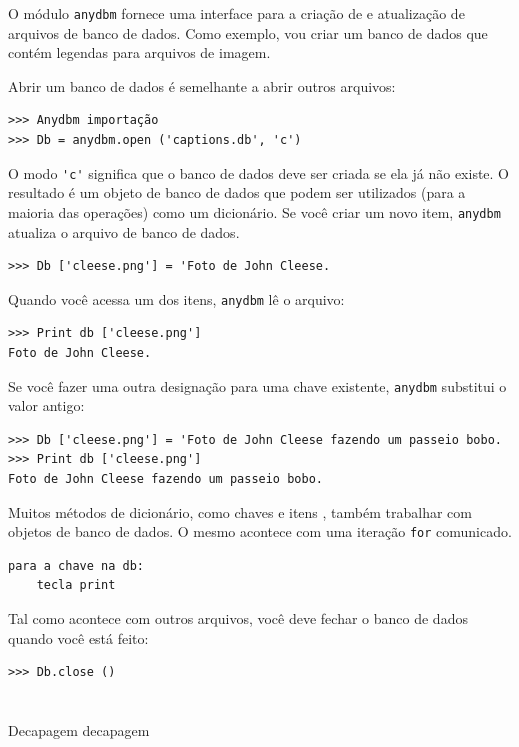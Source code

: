 \documentclass[10pt]{book}
\begin{document}
\begin{exercise}
\begin{v erbatim}
O módulo {\tt anydbm} fornece uma interface para a criação de
e atualização de arquivos de banco de dados. Como exemplo, vou criar um banco de dados
que contém legendas para arquivos de imagem.

Abrir um banco de dados é semelhante a abrir outros arquivos:

\begin{verbatim}
>>> Anydbm importação
>>> Db = anydbm.open ('captions.db', 'c')
\end{verbatim}
%
O modo \verb "'c'" significa que o banco de dados deve ser criada se
ela já não existe. O resultado é um objeto de banco de dados
que podem ser utilizados (para a maioria das operações) como um dicionário.
Se você criar um novo item, {\tt anydbm} atualiza o arquivo de banco de dados.


\begin{verbatim}
>>> Db ['cleese.png'] = 'Foto de John Cleese.
\end{verbatim}
%
Quando você acessa um dos itens, {\tt anydbm} lê o arquivo:

\begin{verbatim}
>>> Print db ['cleese.png']
Foto de John Cleese.
\end{verbatim}
%
Se você fazer uma outra designação para uma chave existente, {\tt anydbm} substitui
o valor antigo:

\begin{verbatim}
>>> Db ['cleese.png'] = 'Foto de John Cleese fazendo um passeio bobo.
>>> Print db ['cleese.png']
Foto de John Cleese fazendo um passeio bobo.
\end{verbatim}
%
Muitos métodos de dicionário, como chaves {\tt} e {itens \tt}, também
trabalhar com objetos de banco de dados. O mesmo acontece com uma iteração {\tt for}
comunicado.

\begin{verbatim}
para a chave na db:
    tecla print
\end{verbatim}
%
Tal como acontece com outros arquivos, você deve fechar o banco de dados quando você está
feito:

\begin{verbatim}
>>> Db.close ()
\end{verbatim}
%


\section{} Decapagem
\index{} decapagem


\end{v erbatim}
\end{exercise}
\end{document}

